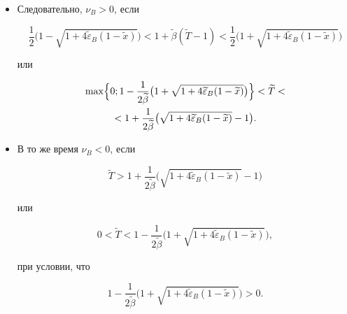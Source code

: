 \begin{itemize}



\item[1.] Следовательно, $\nu_B>0$, если

$$

\frac12

\bigl(1-\sqrt{1+4\widetilde{\varepsilon}_B(1- \widetilde{x})}\bigr)<

1+\widetilde{\beta}(\widetilde{T}-1)<

\frac12

\bigl(1+\sqrt{1+4\widetilde{\varepsilon}_B(1- \widetilde{x})}\bigr)

$$

или

\begin{multline}

\label{lukashev:intervT}

\max

\Bigl\{0; 1-\frac1{2\widetilde{\beta}}

\bigl(1+\sqrt{1+4\widetilde{\varepsilon}_B (1- \widetilde{x})}\bigr)\Bigr\}<\widetilde{T}< \\ < 1+ \frac1{2\widetilde{\beta}}

\bigl(\sqrt{1+4\widetilde{\varepsilon}_B (1- \widetilde{x})}-1\bigr).

\end{multline}

\item[2.]

В то же время $\nu_B<0$, если

\begin{equation}

\label{lukashev:intervTT}

\widetilde{T}> 1+\frac1{2\widetilde{\beta}}

\bigl(\sqrt{1+4\widetilde{\varepsilon}_B (1- \widetilde{x})}-1\bigr)

\end{equation}

или

\begin{equation}

\label{lukashev:intervTTT}

0<\widetilde{T}< 1-\frac1{2\widetilde{\beta}}

\bigl(1+\sqrt{1+4\widetilde{\varepsilon}_B (1- \widetilde{x})}\bigr),

\end{equation}

при условии, что 

$$

1-\frac1{2\widetilde{\beta}}

\bigl(1+\sqrt{1+4\widetilde{\varepsilon}_B(1- \widetilde{x})}\bigr)>0.

$$





\end{itemize}





